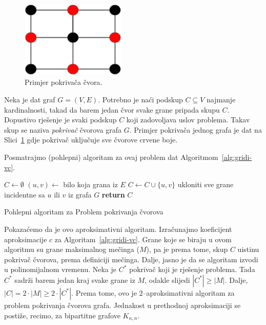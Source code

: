 \documentclass[a4paper, utf8, 11pt, colorlinks]{book}
\begin{document}
    \begin{figure}
  	\centering
  	\includegraphics[width=50mm]{vertex-cover.eps}

  	\caption{Primjer pokrivača čvora.}   	\label{fig:vertex-cover}
  \end{figure}
  Neka je dat graf $G=(V,E)$. Potrebno je naći podskup $C\subseteq V$ najmanje kardinalnosti, takad da barem jedan čvor svake grane pripada skupu $C$.  Dopustivo rješenje je svaki podskup $C$ koji zadovoljava uslov problema. Takav skup se naziva \emph{pokrivač} čvorova grafa $G$. Primjer pokrivača jednog grafa je dat na Slici~\ref{fig:vertex-cover} gdje pokrivač uključuje sve čvorove crvene boje. 
  

  
  Posmatrajmo (pohlepni) algoritam za ovaj problem dat Algoritmom~\ref{alg:gridi-vc}. 
  
  \begin{algorithm}[H] 
  	\begin{algorithmic}[1]
  		\STATE $C \gets \emptyset$
  		\STATE $(u,v) \gets$ bilo koja grana iz $E$
  		\STATE $C \gets C \cup \{u,v\}$
  		\STATE ukloniti sve grane incidentne sa  $u$ ili $v$ iz grafa $G$
  		\ENDWHILE
  		\STATE \textbf{return} $C$
  	\end{algorithmic}   
   
     \caption{Pohlepni algoritam za Problem pokrivanja čvorova}
 \label{alg:gridi-vc}
  \end{algorithm}
  
  \noindent Pokazaćemo da je ovo aproksimativni algoritam. Izračunajmo koeficijent aproksimacije $c$ za Algoritam~\ref{alg:gridi-vc}.
  Grane koje se biraju u ovom algoritmu su grane maksimalnog mečinga ($M$), pa je prema tome, skup $C$ uistinu pokrivač čvorova, prema definiciji mečinga. Dalje, jasno je da se algoritam izvodi u polinomijalnom vremenu. Neka je $C^*$ pokrivač koji je rješenje problema. Tada $C^*$ sadrži barem jedan kraj svake grane iz $M$, odakle slijedi $|C^*|\geq |M|$. Dalje, $|C|= 2 \cdot |M| \geq 2 \cdot |C^*|$. Prema tome, ovo je $2$--aproksimativni algoritam za problem pokrivanja čvorova grafa. Jednakost u prethodnoj aproksimaciji se postiže, recimo, za bipartitne grafove $K_{n,n}$. 
  
\end{document}
